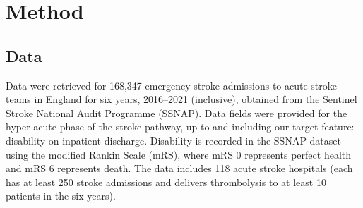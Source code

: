 \section{Method}

\subsection{Data}

Data were retrieved for 168,347 emergency stroke admissions to acute stroke teams in England for six years, 2016–2021 (inclusive), obtained from the Sentinel Stroke National Audit Programme (SSNAP). Data fields were provided for the hyper-acute phase of the stroke pathway, up to and including our target feature: disability on inpatient discharge. Disability is recorded in the SSNAP dataset using the modified Rankin Scale (mRS), where mRS 0 represents perfect health and mRS 6 represents death. The data includes 118 acute stroke hospitals (each has at least 250 stroke admissions and delivers thrombolysis to at least 10 patients in the six years).

